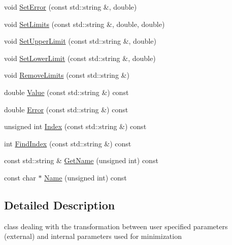 \begin{DoxyCompactItemize}
\item 
void \mbox{\hyperlink{classROOT_1_1Minuit2_1_1MnUserTransformation_ae63d2c7ee55629e691973082b1099e30}{Set\+Error}} (const std\+::string \&, double)
\item 
void \mbox{\hyperlink{classROOT_1_1Minuit2_1_1MnUserTransformation_ae00c15c6e7def8b4c1c1c9d44b52e647}{Set\+Limits}} (const std\+::string \&, double, double)
\item 
void \mbox{\hyperlink{classROOT_1_1Minuit2_1_1MnUserTransformation_aabe0a301a7d6f7fc322afcc4544e1129}{Set\+Upper\+Limit}} (const std\+::string \&, double)
\item 
void \mbox{\hyperlink{classROOT_1_1Minuit2_1_1MnUserTransformation_aebc0f6d54f3ae5d58b86435529c16796}{Set\+Lower\+Limit}} (const std\+::string \&, double)
\item 
void \mbox{\hyperlink{classROOT_1_1Minuit2_1_1MnUserTransformation_ae5e9a3037483cfc354b739ef44cd1867}{Remove\+Limits}} (const std\+::string \&)
\item 
double \mbox{\hyperlink{classROOT_1_1Minuit2_1_1MnUserTransformation_a89cf5aca1d345e0d2d069ad6a54ff94d}{Value}} (const std\+::string \&) const
\item 
double \mbox{\hyperlink{classROOT_1_1Minuit2_1_1MnUserTransformation_a176d46b9b3b58479a92145e7f9293143}{Error}} (const std\+::string \&) const
\item 
unsigned int \mbox{\hyperlink{classROOT_1_1Minuit2_1_1MnUserTransformation_aa4173a2f341790d8e61635eeed2555bb}{Index}} (const std\+::string \&) const
\item 
int \mbox{\hyperlink{classROOT_1_1Minuit2_1_1MnUserTransformation_a9bccf4b65c979cb6b959f8fb787f676a}{Find\+Index}} (const std\+::string \&) const
\item 
const std\+::string \& \mbox{\hyperlink{classROOT_1_1Minuit2_1_1MnUserTransformation_aa2b1548a49a6289914e4cde2fd40d780}{Get\+Name}} (unsigned int) const
\item 
const char $\ast$ \mbox{\hyperlink{classROOT_1_1Minuit2_1_1MnUserTransformation_aabd7adf5448aa905598b93a6d633e0ac}{Name}} (unsigned int) const
\end{DoxyCompactItemize}


\subsection{Detailed Description}
class dealing with the transformation between user specified parameters (external) and internal parameters used for minimization 

